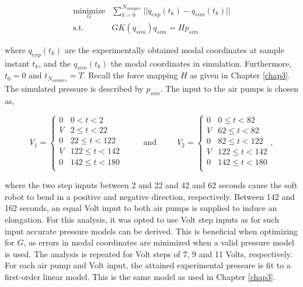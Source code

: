 \begin{equation}
\begin{split}
    \underset{G}{\text{minimize}}& \sum_{k=0}^{N_{samples}} || q_{exp}(t_k) - q_{sim}(t_k)||  \\
    \text{s.t.} \hspace{10pt} & G K(q_{sim}) q_{sim} = Hp_{sim}
    \end{split}
    \label{eq5:optalpha}
\end{equation}

where $q_{exp}(t_k)$ are the experimentally obtained modal coordinates at sample instant $t_k$, and the $q_{sim}(t_k)$ the modal coordinates in simulation. Furthermore, $t_0 = 0$ and $t_{N_{samples}} = T$. Recall the force mapping $H$ as given in Chapter \ref{chap3}. The simulated pressure is described by $p_{sim}$. The input to the air pumps is chosen as,

\begin{equation}
    V_1 =
\begin{cases}
0 & 0 < t < 2\\
V & 2 \leq t < 22\\
0 & 22 \leq t < 122\\
V & 122 \leq t < 142\\
0 & 142 \leq t < 180\\
\end{cases} \hspace{30pt} \text{and} \hspace{30pt}      V_2 =
\begin{cases}
0 & 0 \leq t < 82\\
V & 62 \leq t < 82\\
0 & 82 \leq t < 122\\
V & 122 \leq t < 142\\
0 & 142 \leq t < 180\\
\end{cases} ,
\end{equation}

where the two step inputs between 2 and 22 and 42 and 62 seconds cause the soft robot to bend in a positive and negative direction, respectively. Between 142 and 162 seconds, an equal Volt input to both air pumps is supplied to induce an elongation. For this analysis, it was opted to use Volt step inputs as for such input accurate pressure models can be derived. This is beneficial when optimizing for $G$, as errors in modal coordinates are minimized when a valid pressure model is used. The analysis is repeated for Volt steps of 7, 9 and 11 Volts, respectively. For each air pump and Volt input, the attained experimental pressure is fit to a first-order linear model. This is the same model as used in Chapter \ref{chap3}.

